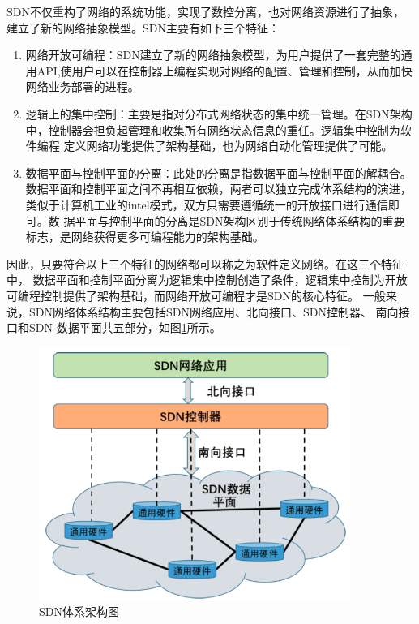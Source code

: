 
SDN不仅重构了网络的系统功能，实现了数控分离，也对网络资源进行了抽象，建立了新的网络抽象模型。SDN主要有如下三个特征：
\begin{enumerate}
  \item 网络开放可编程：SDN建立了新的网络抽象模型，为用户提供了一套完整的通用API,使用户可以在控制器上编程实现对网络的配置、管理和控制，从而加快网络业务部署的进程。
  \item 逻辑上的集中控制：主要是指对分布式网络状态的集中统一管理。在SDN架构中，控制器会担负起管理和收集所有网络状态信息的重任。逻辑集中控制为软件编程 定义网络功能提供了架构基础，也为网络自动化管理提供了可能。
  \item 数据平面与控制平面的分离：此处的分离是指数据平面与控制平面的解耦合。 数据平面和控制平面之间不再相互依赖，两者可以独立完成体系结构的演进，类似于计算机工业的intel模式，双方只需要遵循统一的开放接口进行通信即可。数 据平面与控制平面的分离是SDN架构区别于传统网络体系结构的重要标志，是网络获得更多可编程能力的架构基础。
\end{enumerate}

因此，只要符合以上三个特征的网络都可以称之为软件定义网络。在这三个特征中， 数据平面和控制平面分离为逻辑集中控制创造了条件，逻辑集中控制为开放可编程控制提供了架构基础，而网络开放可编程才是SDN的核心特征。
一般来说，SDN网络体系结构主要包括SDN网络应用、北向接口、SDN控制器、 南向接口和SDN 数据平面共五部分，如图\ref{fig:SDNArchitectureDiagram}所示。

\begin{figure}[htbp]
\centering
\includegraphics[width=4.0in]{figures/SDNArchitectureDiagram}
  \caption{SDN体系架构图}
  \label{fig:SDNArchitectureDiagram}
\end{figure}

